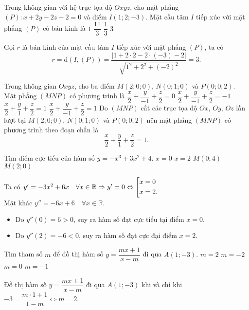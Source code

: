 \begin{ex}%
	Trong không gian với hệ trục tọa độ $Oxyz$, cho mặt phẳng $(P)\colon x+2y-2z-2=0$ và điểm $I(1;2;-3)$. Mặt cầu tâm $I$ tiếp xúc với mặt phẳng $(P)$ có bán kính là 
	\choice
	{$1$}
	{$\dfrac{11}{3}$}
	{$\dfrac{1}{3}$}
	{\True $3$}
	\loigiai
	{ Gọi $r$ là bán kính của mặt cầu tâm  $I$ tiếp xúc với mặt phẳng $(P)$, ta có $$r= \mathrm{d}(I,(P))= \dfrac{|1+2\cdot 2 -2 \cdot (-3)-2|}{\sqrt{1^2+2^2+(-2)^2}}= 3.$$
		
	}
\end{ex}

\begin{ex}%
	Trong không gian $Oxyz$, cho ba điểm $M(2;0;0)$, $N(0;1;0)$ và $P(0;0;2)$. Mặt phẳng $(MNP)$ có phương trình là 
	\choice
	{$\dfrac{x}{2} + \dfrac{y}{-1} + \dfrac{z}{2} = 0$}
	{$\dfrac{x}{2} + \dfrac{y}{-1} + \dfrac{z}{2} = -1$}
	{\True $\dfrac{x}{2} + \dfrac{y}{1} + \dfrac{z}{2} = 1$}
	{$\dfrac{x}{2} + \dfrac{y}{-1}  + \dfrac{z}{2} = 1$}
	\loigiai
	{
	Do $(MNP)$ cắt các trục tọa độ $Ox$, $Oy$, $Oz$ lần lượt tại $M(2;0;0)$, $N(0;1;0)$ và $P(0;0;2)$ nên mặt phẳng $(MNP)$ có phương trình theo đoạn chắn là
		$$\dfrac{x}{2} + \dfrac{y}{1} + \dfrac{z}{2} = 1.$$
	}
\end{ex}

\begin{ex}%
	Tìm điểm cực tiểu của hàm số $y=-x^3+3x^2+4$.
	\choice
	{\True $x=0$}
	{$x=2$}
	{$M(0;4)$}
	{$M(2;0)$}
	\loigiai
	{ Ta có $y'=-3x^2+6x \quad \forall x\in \mathbb{R} \Rightarrow y'=0 \Leftrightarrow \left[\begin{aligned}&x=0\\&x=2.\end{aligned}\right.$\\
	Mặt khác $y''=-6x+6 \quad \forall x \in \mathbb{R}$.
	\begin{itemize}
		\item  Do $y''(0)=6>0 $, suy ra hàm số đạt cực tiểu tại điểm $x=0$.
		\item  Do $y''(2)=-6<0 $, suy ra hàm số đạt cực đại điểm $x=2$.
	\end{itemize}
		
	}
\end{ex}

\begin{ex}%
	Tìm tham số $m$ để đồ thị hàm số $y=\dfrac{mx+1}{x-m}$ đi qua $A(1;-3).$
	\choice
	{\True$ m=2$}
	{$m=-2$}
	{$m=0$}
	{$m=-1$}
	\loigiai
	{ Đồ thị hàm số $y=\dfrac{mx+1}{x-m}$ đi qua $A(1;-3)$ khi và chỉ khi $-3=\dfrac{m\cdot 1 +1}{1-m} \Leftrightarrow m=2.$
		
	}
\end{ex}

